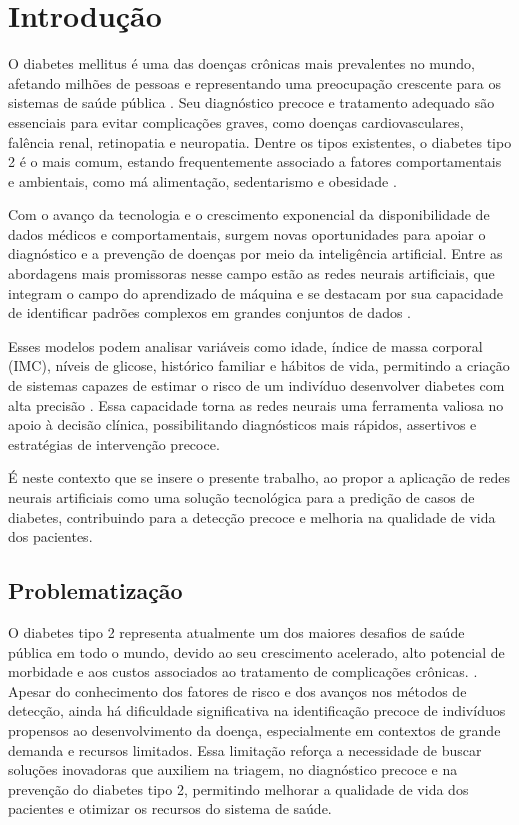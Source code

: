 \chapter{Introdução}
O diabetes mellitus é uma das doenças crônicas mais prevalentes no mundo, afetando milhões de pessoas e representando uma preocupação crescente para os sistemas de saúde pública \cite{SBD2025, WHO2016, IDF2021}. Seu diagnóstico precoce e tratamento adequado são essenciais para evitar complicações graves, como doenças cardiovasculares, falência renal, retinopatia e neuropatia. Dentre os tipos existentes, o diabetes tipo 2 é o mais comum, estando frequentemente associado a fatores comportamentais e ambientais, como má alimentação, sedentarismo e obesidade \cite{IDF2021}.

Com o avanço da tecnologia e o crescimento exponencial da disponibilidade de dados médicos e comportamentais, surgem novas oportunidades para apoiar o diagnóstico e a prevenção de doenças por meio da inteligência artificial. Entre as abordagens mais promissoras nesse campo estão as redes neurais artificiais, que integram o campo do aprendizado de máquina e se destacam por sua capacidade de identificar padrões complexos em grandes conjuntos de dados \cite{Miotto2018,Deo2015}.

Esses modelos podem analisar variáveis como idade, índice de massa corporal (IMC), níveis de glicose, histórico familiar e hábitos de vida, permitindo a criação de sistemas capazes de estimar o risco de um indivíduo desenvolver diabetes com alta precisão \cite{Sisodia2018,Kavakiotis2017}. Essa capacidade torna as redes neurais uma ferramenta valiosa no apoio à decisão clínica, possibilitando diagnósticos mais rápidos, assertivos e estratégias de intervenção precoce.

É neste contexto que se insere o presente trabalho, ao propor a aplicação de redes neurais artificiais como uma solução tecnológica para a predição de casos de diabetes, contribuindo para a detecção precoce e melhoria na qualidade de vida dos pacientes.

\section{Problematização}
O diabetes tipo 2 representa atualmente um dos maiores desafios de saúde pública em todo o mundo, devido ao seu crescimento acelerado, alto potencial de morbidade e aos custos associados ao tratamento de complicações crônicas. \cite{SBD2025,WHO2016,IDF2021}. Apesar do conhecimento dos fatores de risco e dos avanços nos métodos de detecção, ainda há dificuldade significativa na identificação precoce de indivíduos propensos ao desenvolvimento da doença, especialmente em contextos de grande demanda e recursos limitados. \cite{IDF2021} Essa limitação reforça a necessidade de buscar soluções inovadoras que auxiliem na triagem, no diagnóstico precoce e na prevenção do diabetes tipo 2, permitindo melhorar a qualidade de vida dos pacientes e otimizar os recursos do sistema de saúde. \cite{Sisodia2018,Kavakiotis2017}

